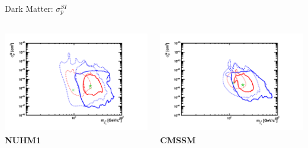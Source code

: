 \documentclass{beamer}
\begin{document}
\begin{frame}{Dark Matter: $\sigma_{p}^{SI}$}
  \begin{columns}
    \begin{column}{0.5\textwidth}
      \includegraphics[height=4.5cm]{ssd/nuhm1.pdf}\\ 
      \textbf{NUHM1}
    \end{column}
    \begin{column}{0.5\textwidth}
      \includegraphics[height=4.5cm]{ssd/cmssm.pdf}\\
      \textbf{CMSSM}
    \end{column}
  \end{columns}
\end{frame}
\end{document}
